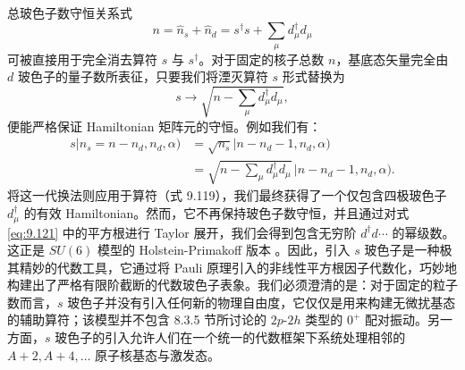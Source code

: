 总玻色子数守恒关系式
\[
n=\hat{n}_{s}+\hat{n}_{d}=s^{\dagger}s+\sum_{\mu}d^{\dagger}_{\mu}d_{\mu}
\]
可被直接用于完全消去算符 $s$ 与 $s^{\dagger}$。对于固定的核子总数 $n$，基底态矢量完全由 $d$ 玻色子的量子数所表征，只要我们将湮灭算符
$s$ 形式替换为
\begin{equation}
s\to\sqrt{n-\sum_{\mu}d^{\dagger}_{\mu}d_{\mu}},\label{eq:9.121}
\end{equation}
便能严格保证 Hamiltonian 矩阵元的守恒。例如我们有：
\begin{align*}
s|n_{s}=n-n_{d},n_{d},\alpha) & =\sqrt{n_{s}}|n-n_{d}-1,n_{d},\alpha)\\
 & =\sqrt{n-\sum_{\mu}d^{\dagger}_{\mu}d_{\mu}}\,|n-n_{d}-1,n_{d},\alpha).
\end{align*}
将这一代换法则应用于算符（式 9.119），我们最终获得了一个仅包含四极玻色子 $d^{\dagger}_{\mu}$ 的有效 Hamiltonian。然而，它不再保持玻色子数守恒，并且通过对式
\ref{eq:9.121} 中的平方根进行 Taylor 展开，我们会得到包含无穷阶 $d^{\dagger}d\cdots$
的幂级数。这正是 $SU(6)$ 模型的 Holstein-Primakoff 版本 \cite{JJD74}。因此，引入 $s$
玻色子是一种极其精妙的代数工具，它通过将 Pauli 原理引入的非线性平方根因子代数化，巧妙地构建出了严格有限阶截断的代数玻色子表象。我们必须澄清的是：对于固定的粒子数而言，$s$
玻色子并没有引入任何新的物理自由度，它仅仅是用来构建无微扰基态的辅助算符；该模型并不包含 8.3.5 节所讨论的 $2p\text{-}2h$
类型的 $0^{+}$ 配对振动。另一方面，$s$ 玻色子的引入允许人们在一个统一的代数框架下系统处理相邻的 $A+2,A+4,\ldots$
原子核基态与激发态。

